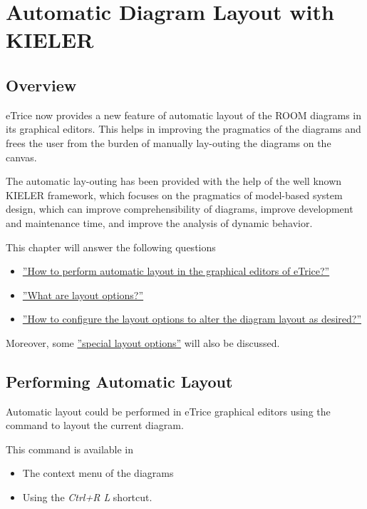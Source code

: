 \chapter{Automatic Diagram Layout with KIELER}

\section{Overview}

eTrice now provides a new feature of automatic layout of the ROOM diagrams in its graphical editors. This helps in improving the pragmatics of the diagrams and frees the user from the burden of manually lay-outing the diagrams on the canvas. 

The automatic lay-outing has been provided with the help of the well known KIELER framework, which focuses on the pragmatics of model-based system design, which can improve comprehensibility of diagrams, improve development and maintenance time, and improve the analysis of dynamic behavior.

This chapter will answer the following questions
\begin{itemize}
\item \hyperref[performLayout]{''How to perform automatic layout in the graphical editors of eTrice?''}
\item \hyperref[layoutOptions]{''What are layout options?''}
\item \hyperref[configureOptions]{''How to configure the layout options to alter the diagram layout as desired?''}
\end{itemize}

Moreover, some \hyperref[specialOptions]{''special layout options''} will also be discussed.

\section{\label{performLayout}Performing Automatic Layout} 

Automatic layout could be performed in eTrice graphical editors using the command to layout the current diagram.

This command is available in
\begin{itemize}
\item The context menu of the diagrams
\item Using the \textit{Ctrl+R L} shortcut.
\end{itemize}

